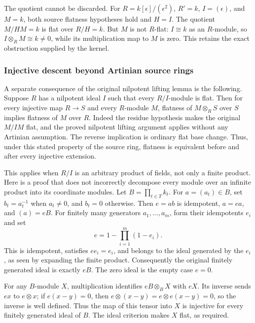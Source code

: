 The quotient cannot be discarded. For \(R=k[\epsilon]/(\epsilon^2)\), \(R'=k\), \(I=(\epsilon)\), and \(M=k\), both source flatness hypotheses hold and \(H=I\). The quotient \(M/HM=k\) is flat over \(R/H=k\). But \(M\) is not \(R\)-flat: \(I\cong k\) as an \(R\)-module, so \(I\otimes_RM\cong k\ne0\), while its multiplication map to \(M\) is zero. This retains the exact obstruction supplied by the kernel.

\subsubsection{Injective descent beyond Artinian source rings}\label{algebra-proof-017-injective-descent-beyond-artinian-source-rings}

A separate consequence of the original nilpotent lifting lemma is the following. Suppose \(R\) has a nilpotent ideal \(I\) such that every \(R/I\)-module is flat. Then for every injective map \(R\to S\) and every \(R\)-module \(M\), flatness of \(M\otimes_RS\) over \(S\) implies flatness of \(M\) over \(R\). Indeed the residue hypothesis makes the original \(M/IM\) flat, and the proved nilpotent lifting argument applies without any Artinian assumption. The reverse implication is ordinary flat base change. Thus, under this stated property of the source ring, flatness is equivalent before and after every injective extension.

This applies when \(R/I\) is an arbitrary product of fields, not only a finite product. Here is a proof that does not incorrectly decompose every module over an infinite product into its coordinate modules. Let \(B=\prod_{t\in T}k_t\). For \(a=(a_t)\in B\), set \(b_t=a_t^{-1}\) when \(a_t\ne0\), and \(b_t=0\) otherwise. Then \(e=ab\) is idempotent, \(a=ea\), and \((a)=eB\). For finitely many generators \(a_1,\ldots,a_m\), form their idempotents \(e_i\) and set \[
e=1-\prod_{i=1}^m(1-e_i).
\] This is idempotent, satisfies \(ee_i=e_i\), and belongs to the ideal generated by the \(e_i\), as seen by expanding the finite product. Consequently the original finitely generated ideal is exactly \(eB\). The zero ideal is the empty case \(e=0\).

For any \(B\)-module \(X\), multiplication identifies \(eB\otimes_BX\) with \(eX\). Its inverse sends \(ex\) to \(e\otimes x\); if \(e(x-y)=0\), then \(e\otimes(x-y)=e\otimes e(x-y)=0\), so the inverse is well defined. Thus the map of this tensor into \(X\) is injective for every finitely generated ideal of \(B\). The ideal criterion makes \(X\) flat, as required.


